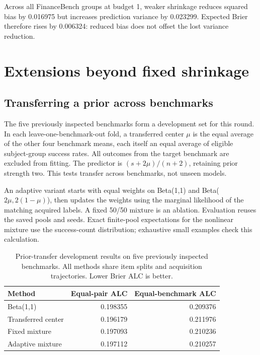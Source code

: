 \documentclass{article}
\begin{document}
Across all FinanceBench groups at budget 1, weaker shrinkage reduces squared bias by 0.016975 but increases prediction variance by 0.023299. Expected Brier therefore rises by 0.006324: reduced bias does not offset the lost variance reduction.

\section{Extensions beyond fixed shrinkage}\label{extensions-beyond-fixed-shrinkage}

\subsection{Transferring a prior across benchmarks}\label{transferring-a-prior-across-benchmarks}

The five previously inspected benchmarks form a development set for this round. In each leave-one-benchmark-out fold, a transferred center \(\mu\) is the equal average of the other four benchmark means, each itself an equal average of eligible subject-group success rates. All outcomes from the target benchmark are excluded from fitting. The predictor is \((s+2\mu)/(n+2)\), retaining prior strength two. This tests transfer across benchmarks, not unseen models.

An adaptive variant starts with equal weights on Beta(1,1) and Beta(\(2\mu,2(1-\mu)\)), then updates the weights using the marginal likelihood of the matching acquired labels. A fixed 50/50 mixture is an ablation. Evaluation reuses the saved pools and seeds. Exact finite-pool expectations for the nonlinear mixture use the success-count distribution; exhaustive small examples check this calculation.

\begin{table}[ht]
\centering
\caption{Prior-transfer development results on five previously inspected benchmarks. All methods share item splits and acquisition trajectories. Lower Brier ALC is better.}
\label{tab:transfer}
\begin{tabular}{lrr}
\toprule
Method & Equal-pair ALC & Equal-benchmark ALC \\
\midrule
Beta(1,1) & 0.198355 & 0.209376 \\
Transferred center & 0.196179 & 0.211976 \\
Fixed mixture & 0.197093 & 0.210236 \\
Adaptive mixture & 0.197112 & 0.210257 \\
\bottomrule
\end{tabular}
\end{table}
\end{document}
